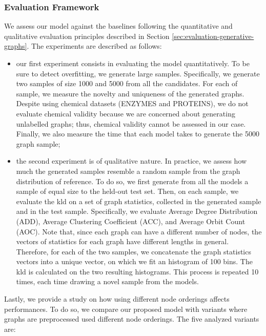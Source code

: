 \subsubsection*{Evaluation Framework}
We assess our model against the baselines following the quantitative and qualitative evaluation principles described in Section \ref{sec:evaluation-generative-graphs}. The experiments are described as follows:
\begin{itemize}
    \item our first experiment consists in evaluating the model quantitatively. To be sure to detect overfitting, we generate large samples. Specifically, we generate two samples of size 1000 and 5000 from all the candidates. For each of sample, we measure the novelty and uniqueness of the generated graphs. Despite using chemical datasets (ENZYMES and PROTEINS), we do not evaluate chemical validity because we are concerned about generating unlabelled graphs; thus, chemical validity cannot be assessed in our case. Finally, we also measure the time that each model takes to generate the 5000 graph sample;
    \item the second experiment is of qualitative nature. In practice, we assess how much the generated samples resemble a random sample from the graph distribution of reference. To do so, we first generate from all the models a sample of equal size to the held-out test set. Then, on each sample, we evaluate the \gls{kld} on a set of graph statistics, collected in the generated sample and in the test sample. Specifically, we evaluate Average Degree Distribution (ADD), Average Clustering Coefficient (ACC), and Average Orbit Count (AOC). Note that, since each graph can have a different number of nodes, the vectors of statistics for each graph have different lengths in general. Therefore, for each of the two samples, we concatenate the graph statistics vectors into a unique vector, on which we fit an histogram of 100 bins. The \gls{kld} is calculated on the two resulting histograms. This process is repeated 10 times, each time drawing a novel sample from the models.
\end{itemize}
Lastly, we provide a study on how using different node orderings affects performances. To do so, we compare our proposed model with variants where graphs are preprocessed used different node orderings. The five analyzed variants are:
